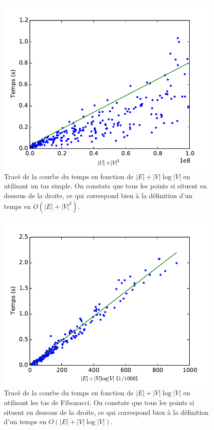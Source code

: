 \documentclass{article}
\begin{document}
\begin{figure}
  \begin{center}
    \includegraphics{reg_queue.pdf}
  \end{center}
  \caption{\label{fig:reg_queue}Tracé de la courbe du temps en fonction de
    $|E| + |V|\log |V|$ en utilisant un tas simple.
    On constate que tous les points si situent en
    dessous de la droite, ce qui correspond bien à la définition d'un
    temps en $O(|E| + |V|^2)$.}
\end{figure}
\begin{figure}
  \begin{center}
    \includegraphics{reg.pdf}
  \end{center}
  \caption{\label{fig:reg_fib}Tracé de la courbe du temps en fonction de
    $|E| + |V|\log |V|$ en utilisant les tas de Fibonacci.
    On constate que tous les points si situent en
    dessous de la droite, ce qui correspond bien à la définition d'un
    temps en $O(|E| + |V|\log |V|)$.}
\end{figure}
\end{document}
